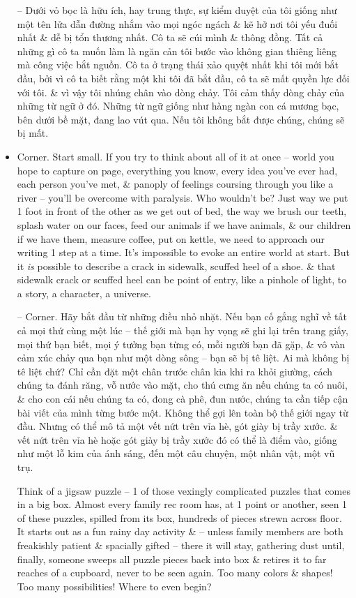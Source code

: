 \documentclass{article}
\begin{document}
\begin{itemize}
	-- Dưới vỏ bọc là hữu ích, hay trung thực, sự kiểm duyệt của tôi giống như một tên lửa dẫn đường nhắm vào mọi ngóc ngách \& kẽ hở nơi tôi yếu đuối nhất \& dễ bị tổn thương nhất. Cô ta sẽ cúi mình \& thông đồng. Tất cả những gì cô ta muốn làm là ngăn cản tôi bước vào không gian thiêng liêng mà công việc bắt nguồn. Cô ta ở trạng thái xảo quyệt nhất khi tôi mới bắt đầu, bởi vì cô ta biết rằng một khi tôi đã bắt đầu, cô ta sẽ mất quyền lực đối với tôi. \& vì vậy tôi nhúng chân vào dòng chảy. Tôi cảm thấy dòng chảy của những từ ngữ ở đó. Những từ ngữ giống như hàng ngàn con cá mương bạc, bên dưới bề mặt, đang lao vút qua. Nếu tôi không bắt được chúng, chúng sẽ bị mất.
	\item {\sf Corner.} Start small. If you try to think about all of it at once -- world you hope to capture on page, everything you know, every idea you've ever had, each person you've met, \& panoply of feelings coursing through you like a river -- you'll be overcome with paralysis. Who wouldn't be? Just way we put 1 foot in front of the other as we get out of bed, the way we brush our teeth, splash water on our faces, feed our animals if we have animals, \& our children if we have them, measure coffee, put on kettle, we need to approach our writing 1 step at a time. It's impossible to evoke an entire world at start. But it {\it is} possible to describe a crack in sidewalk, scuffed heel of a shoe. \& that sidewalk crack or scuffed heel can be point of entry, like a pinhole of light, to a story, a character, a universe.
	
	-- {\sf Corner.} Hãy bắt đầu từ những điều nhỏ nhặt. Nếu bạn cố gắng nghĩ về tất cả mọi thứ cùng một lúc -- thế giới mà bạn hy vọng sẽ ghi lại trên trang giấy, mọi thứ bạn biết, mọi ý tưởng bạn từng có, mỗi người bạn đã gặp, \& vô vàn cảm xúc chảy qua bạn như một dòng sông -- bạn sẽ bị tê liệt. Ai mà không bị tê liệt chứ? Chỉ cần đặt một chân trước chân kia khi ra khỏi giường, cách chúng ta đánh răng, vỗ nước vào mặt, cho thú cưng ăn nếu chúng ta có nuôi, \& cho con cái nếu chúng ta có, đong cà phê, đun nước, chúng ta cần tiếp cận bài viết của mình từng bước một. Không thể gợi lên toàn bộ thế giới ngay từ đầu. Nhưng có thể mô tả một vết nứt trên vỉa hè, gót giày bị trầy xước. \& vết nứt trên vỉa hè hoặc gót giày bị trầy xước đó có thể là điểm vào, giống như một lỗ kim của ánh sáng, đến một câu chuyện, một nhân vật, một vũ trụ.
	
	Think of a jigsaw puzzle -- 1 of those vexingly complicated puzzles that comes in a big box. Almost every family rec room has, at 1 point or another, seen 1 of these puzzles, spilled from its box, hundreds of pieces strewn across floor. It starts out as a fun rainy day activity \& -- unless family members are both freakishly patient \& spacially gifted -- there it will stay, gathering dust until, finally, someone sweeps all puzzle pieces back into box \& retires it to far reaches of a cupboard, never to be seen again. Too many colors \& shapes! Too many possibilities! Where to even begin?
	

\end{itemize}
\end{document}
